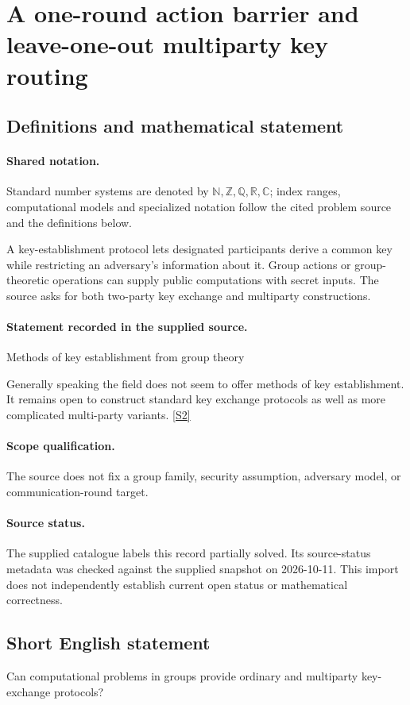 \documentclass[11pt]{article}
\newcommand{\sref}[2]{\hyperlink{source:#1:#2}{[S#2]}}
\begin{document}
\section{A one-round action barrier and leave-one-out multiparty key routing}\label{statement}

\subsection{Definitions and mathematical statement}

\paragraph{Shared notation.}Standard number systems are denoted by $\mathbb N,\mathbb Z,\mathbb Q,\mathbb R,\mathbb C$; index ranges, computational models and specialized notation follow the cited problem source and the definitions below.


A key-establishment protocol lets designated participants derive a common key while restricting an adversary's information about it. Group actions or group-theoretic operations can supply public computations with secret inputs. The source asks for both two-party key exchange and multiparty constructions.
\paragraph{Statement recorded in the supplied source.}
Methods of key establishment from group theory

Generally speaking the field does not seem to offer methods of key establishment. It remains open to construct standard key exchange protocols as well as more complicated multi-party variants. \sref{statement}{2}
\paragraph{Scope qualification.}
The source does not fix a group family, security assumption, adversary model, or communication-round target.
\paragraph{Source status.}
The supplied catalogue labels this record partially solved. Its source-status metadata was checked against the supplied snapshot on 2026-10-11. This import does not independently establish current open status or mathematical correctness.
\subsection{Short English statement}
Can computational problems in groups provide ordinary and multiparty key-exchange protocols?
\end{document}
